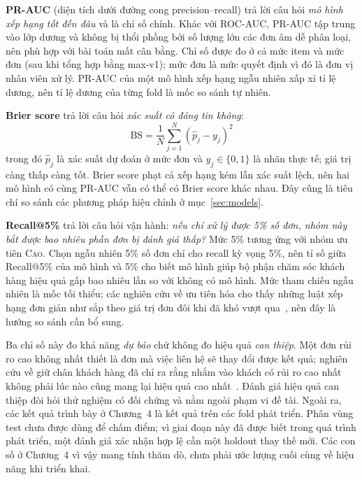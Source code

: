 \textbf{PR-AUC} (diện tích dưới đường cong precision--recall) trả lời câu hỏi \emph{mô hình xếp hạng tốt đến đâu} và là chỉ số chính. Khác với ROC-AUC, PR-AUC tập trung vào lớp dương và không bị thổi phồng bởi số lượng lớn các đơn âm dễ phân loại, nên phù hợp với bài toán mất cân bằng. Chỉ số được đo ở cả mức item và mức đơn (sau khi tổng hợp bằng max-v1); mức đơn là mức quyết định vì đó là đơn vị nhân viên xử lý. PR-AUC của một mô hình xếp hạng ngẫu nhiên xấp xỉ tỉ lệ dương, nên tỉ lệ dương của từng fold là mốc so sánh tự nhiên.

\textbf{Brier score} trả lời câu hỏi \emph{xác suất có đáng tin không}:
\begin{equation}\label{eq:brier}
  \mathrm{BS} = \frac{1}{N}\sum_{j=1}^{N}\left(\hat{p}_j - y_j\right)^2
\end{equation}
trong đó $\hat p_j$ là xác suất dự đoán ở mức đơn và $y_j \in \{0,1\}$ là nhãn thực tế; giá trị càng thấp càng tốt. Brier score phạt cả xếp hạng kém lẫn xác suất lệch, nên hai mô hình có cùng PR-AUC vẫn có thể có Brier score khác nhau. Đây cũng là tiêu chí so sánh các phương pháp hiệu chỉnh ở mục~\ref{sec:models}.

\textbf{Recall@5\%} trả lời câu hỏi vận hành: \emph{nếu chỉ xử lý được 5\% số đơn, nhóm này bắt được bao nhiêu phần đơn bị đánh giá thấp?} Mức 5\% tương ứng với nhóm ưu tiên \textsc{Cao}. Chọn ngẫu nhiên 5\% số đơn chỉ cho recall kỳ vọng 5\%, nên tỉ số giữa Recall@5\% của mô hình và 5\% cho biết mô hình giúp bộ phận chăm sóc khách hàng hiệu quả gấp bao nhiêu lần so với không có mô hình. Mức tham chiếu ngẫu nhiên là mốc tối thiểu; các nghiên cứu về ưu tiên hóa cho thấy những luật xếp hạng đơn giản như sắp theo giá trị đơn đôi khi đã khó vượt qua~\cite{li2026valuesorting}, nên đây là hướng so sánh cần bổ sung.

Ba chỉ số này đo khả năng \emph{dự báo} chứ không đo hiệu quả \emph{can thiệp}. Một đơn rủi ro cao không nhất thiết là đơn mà việc liên hệ sẽ thay đổi được kết quả; nghiên cứu về giữ chân khách hàng đã chỉ ra rằng nhắm vào khách có rủi ro cao nhất không phải lúc nào cũng mang lại hiệu quả cao nhất~\cite{ascarza2018}. Đánh giá hiệu quả can thiệp đòi hỏi thử nghiệm có đối chứng và nằm ngoài phạm vi đề tài. Ngoài ra, các kết quả trình bày ở Chương~4 là kết quả trên các fold phát triển. Phân vùng test chưa được dùng để chấm điểm; vì giai đoạn này đã được biết trong quá trình phát triển, một đánh giá xác nhận hợp lệ cần một holdout thay thế mới. Các con số ở Chương~4 vì vậy mang tính thăm dò, chưa phải ước lượng cuối cùng về hiệu năng khi triển khai.
